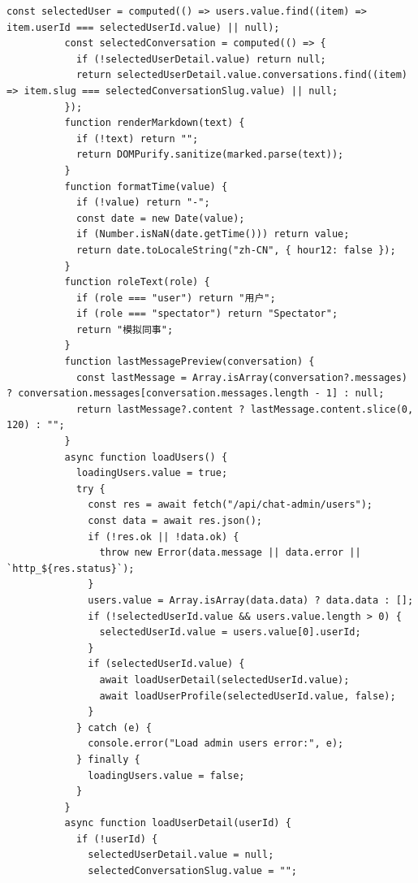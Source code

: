 \documentclass[12pt,a4paper]{article}
\begin{document}
\newpage
{}
\fancyhead[R]{}
\begin{Verbatim}[fontsize=\footnotesize]
          const selectedUser = computed(() => users.value.find((item) => item.userId === selectedUserId.value) || null);
          const selectedConversation = computed(() => {
            if (!selectedUserDetail.value) return null;
            return selectedUserDetail.value.conversations.find((item) => item.slug === selectedConversationSlug.value) || null;
          });
          function renderMarkdown(text) {
            if (!text) return "";
            return DOMPurify.sanitize(marked.parse(text));
          }
          function formatTime(value) {
            if (!value) return "-";
            const date = new Date(value);
            if (Number.isNaN(date.getTime())) return value;
            return date.toLocaleString("zh-CN", { hour12: false });
          }
          function roleText(role) {
            if (role === "user") return "用户";
            if (role === "spectator") return "Spectator";
            return "模拟同事";
          }
          function lastMessagePreview(conversation) {
            const lastMessage = Array.isArray(conversation?.messages) ? conversation.messages[conversation.messages.length - 1] : null;
            return lastMessage?.content ? lastMessage.content.slice(0, 120) : "";
          }
          async function loadUsers() {
            loadingUsers.value = true;
            try {
              const res = await fetch("/api/chat-admin/users");
              const data = await res.json();
              if (!res.ok || !data.ok) {
                throw new Error(data.message || data.error || `http_${res.status}`);
              }
              users.value = Array.isArray(data.data) ? data.data : [];
              if (!selectedUserId.value && users.value.length > 0) {
                selectedUserId.value = users.value[0].userId;
              }
              if (selectedUserId.value) {
                await loadUserDetail(selectedUserId.value);
                await loadUserProfile(selectedUserId.value, false);
              }
            } catch (e) {
              console.error("Load admin users error:", e);
            } finally {
              loadingUsers.value = false;
            }
          }
          async function loadUserDetail(userId) {
            if (!userId) {
              selectedUserDetail.value = null;
              selectedConversationSlug.value = "";
\end{Verbatim}
\newpage
{}
\end{document}
